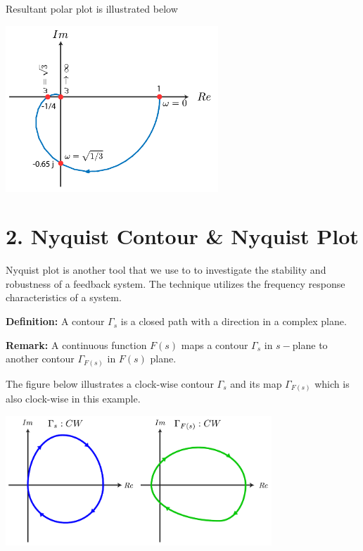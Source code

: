 \documentclass{article}
\begin{document}
Resultant polar plot is illustrated below

\vspace{6 pt}

  \begin{minipage}[h]{1\linewidth}
    \begin{center}
      \includegraphics[width=0.6\textwidth]{figs/polar5}
    \end{center}
  \end{minipage}

\vspace{6 pt}

\section*{2. Nyquist Contour \& Nyquist Plot}

Nyquist plot is another tool that we use to to investigate 
the stability and robustness of a feedback system. The technique 
utilizes the frequency response characteristics of a system.

\textbf{Definition:} A contour $\Gamma_s$ is a closed path with a direction
in a complex plane. 

\textbf{Remark:} A continuous function $F(s)$ maps a contour
$\Gamma_s$ in $s-$plane to another contour $\Gamma_{F(s)}$
in $F(s)$ plane. 

The figure below illustrates a clock-wise contour 
$\Gamma_s$ and its map $\Gamma_{F(s)}$ which is also clock-wise
in this example. 

\vspace{6 pt}

  \begin{minipage}[h]{1\linewidth}
    \begin{center}
      \includegraphics[width=0.75\textwidth]{figs/cmap}
    \end{center}
  \end{minipage}
  
\end{document}
